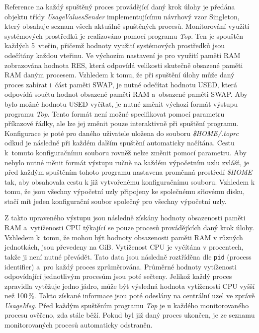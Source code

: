 Reference na každý spuštěný proces provádějící daný krok úlohy je předána objektu třídy \textit{UsageValuesSender} implementujícímu návrhový vzor Singleton, který obsahuje seznam všech aktuálně spuštěných procesů. Monitorování využití systémových prostředků je realizováno pomocí programu \textit{Top}. Ten je spouštěn každých 5~vteřin, přičemž hodnoty využití systémových prostředků jsou odečítány každou vteřinu. Ve výchozím nastavení je pro využití paměti RAM zobrazována hodnota RES, která odpovídá velikosti skutečně obsazené paměti RAM daným procesem. Vzhledem k tomu, že při spuštění úlohy může daný proces zabírat i~část paměti SWAP, je nutné odečítat hodnotu USED, která odpovídá součtu hodnot obsazené paměti RAM a~obsazené paměti SWAP. Aby bylo možné hodnotu USED vyčítat, je nutné změnit výchozí formát výstupu programu \textit{Top}. Tento formát není možné specifikovat pomocí parametru příkazové řádky, ale lze jej změnit pouze interaktivně při spuštění programu. Konfigurace je poté pro daného uživatele uložena do souboru \textit{\$HOME/.toprc} odkud je následně při každém dalším spuštění automaticky načítána. Cestu k~tomuto konfiguračnímu souboru rovněž nelze změnit pomocí parametru. Aby nebylo nutné měnit formát výstupu ručně na každém výpočetním uzlu zvlášť, je před každým spuštěním tohoto programu nastavena proměnná prostředí \textit{\$HOME} tak, aby obsahovala cestu k již vytvořenému konfiguračnímu souboru. Vzhledem k tomu, že jsou všechny výpočetní uzly připojeny ke společnému síťovému disku, stačí mít jeden konfigurační soubor společný pro všechny výpočetní uzly.

Z takto upraveného výstupu jsou následně získány hodnoty obsazenosti paměti RAM a~vytíženosti CPU týkající se pouze procesů provádějících daný krok úlohy. Vzhledem k~tomu, že mohou být hodnoty obsazenosti paměti RAM v různých jednotkách, jsou převedeny na GiB. Vytíženost CPU je vyčítána v procentech, takže ji není nutné převádět. Tato data jsou následně roztříděna dle \texttt{pid} (process identifier) a~pro každý proces zprůměrována. Průměrné hodnoty vytíženosti odpovídající jednotlivým procesům jsou poté sečteny. Jelikož každý proces zpravidla vytěžuje jedno jádro, může být výsledná hodnota vytíženosti CPU vyšší než 100\,\%. Takto získané informace jsou poté odeslány na centrální uzel ve zprávě \textit{UsageMsg}. Před každým spuštěním programu \textit{Top} je u každého monitorovaného procesu ověřeno, zda stále běží. Pokud byl již daný proces ukončen, je ze seznamu monitorovaných procesů automaticky odstraněn.

